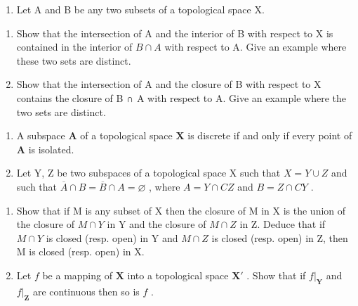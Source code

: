 \begin{enumerate}
\def\labelenumi{\arabic{enumi})}
\setcounter{enumi}{1}
\tightlist
\item
  Let A and B be any two subsets of a topological space X.
\end{enumerate}

\begin{enumerate}
\def\labelenumi{\alph{enumi})}
\item
  Show that the intersection of A and the interior of B with respect to X is contained in the interior of \(B \cap A\) with respect to A. Give an example where these two sets are distinct.
\item
  Show that the intersection of A and the closure of B with respect to X contains the closure of B ∩ A with respect to A. Give an example where the two sets are distinct.
\end{enumerate}

\begin{enumerate}
\def\labelenumi{\arabic{enumi})}
\setcounter{enumi}{2}
\item
  A subspace \(\mathbf{A}\) of a topological space \(\mathbf{X}\) is discrete if and only if every point of \(\mathbf{A}\) is isolated.
\item
  Let Y, Z be two subspaces of a topological space X such that \(X = Y \cup Z\) and such that \(\overline{A} \cap B = \overline{B} \cap A = \varnothing\) , where \(A = Y \cap CZ\) and \(B = Z \cap CY\) .
\end{enumerate}

\begin{enumerate}
\def\labelenumi{\alph{enumi})}
\item
  Show that if M is any subset of X then the closure of M in X is the union of the closure of \(M \cap Y\) in Y and the closure of \(M \cap Z\) in Z. Deduce that if \(M \cap Y\) is closed (resp. open) in Y and \(M \cap Z\) is closed (resp. open) in Z, then M is closed (resp. open) in X.
\item
  Let \(f\) be a mapping of \(\mathbf{X}\) into a topological space \(\mathbf{X}'\) . Show that if \(f|_{\mathbf{Y}}\) and \(f|_{\mathbf{Z}}\) are continuous then so is \(f\) .
\end{enumerate}


